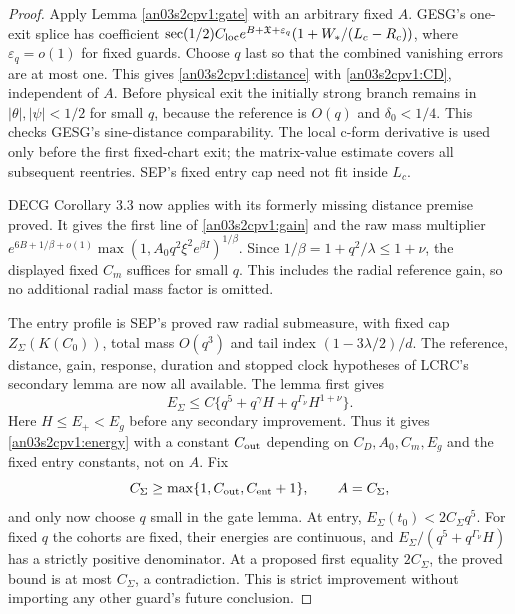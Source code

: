 \documentclass[11pt]{article}
\theoremstyle{remark}\newtheorem{remark}[theorem]{Remark}
\newcommand{\eps}{\varepsilon}
\begin{document}
\begin{proof}
Apply Lemma \ref{an03s2cpv1:gate} with an arbitrary fixed $A$.
GESG's one-exit splice has coefficient
$\sec(1/2)C_{\rm loc}e^{B+\mathfrak X+\eps_q}
(1+W_*/(L_c-R_c))$, where $\eps_q=o(1)$ for fixed guards.
Choose $q$ last so that the combined vanishing errors are at
most one. This gives \eqref{an03s2cpv1:distance} with
\eqref{an03s2cpv1:CD}, independent of $A$.
Before physical exit the initially strong branch remains in
$|\theta|,|\psi|<1/2$ for small $q$, because the reference is
$O(q)$ and $\delta_0<1/4$. This checks GESG's sine-distance
comparability. The local c-form derivative is used only before
the first fixed-chart exit; the matrix-value estimate covers
all subsequent reentries. SEP's fixed entry cap need not fit
inside $L_c$.

DECG Corollary 3.3 now applies with its formerly missing distance
premise proved. It gives the first line of
\eqref{an03s2cpv1:gain} and the raw mass multiplier
$e^{6B+1/\beta+o(1)}\max(1,A_0q^2\xi^2e^{\beta I})^{1/\beta}$.
Since $1/\beta=1+q^2/\lambda\le1+\nu$, the displayed fixed
$C_m$ suffices for small $q$. This includes the radial reference
gain, so no additional radial mass factor is omitted.

The entry profile is SEP's proved raw radial submeasure, with
fixed cap $Z_\Sigma(K(C_0))$, total mass $O(q^3)$ and tail index
$(1-3\lambda/2)/d$. The reference, distance, gain, response,
duration and stopped clock hypotheses of LCRC's secondary lemma
are now all available. The lemma first gives
\[
 E_\Sigma\le C\{q^5+q^\gamma H+q^{\Gamma_\nu}H^{1+\nu}\}.
\]
Here $H\le E_+<E_g$ before any secondary improvement. Thus it
gives \eqref{an03s2cpv1:energy} with a constant $C_{\rm out}$
depending on $C_D,A_0,C_m,E_g$ and the fixed entry constants,
not on $A$. Fix
\begin{equation}
 C_\Sigma\ge\max\{1,C_{\rm out},C_{\rm ent}+1\},\qquad A=C_\Sigma,
 \label{an03s2cpv1:chooseSigma}
\end{equation}
and only now choose $q$ small in the gate lemma. At entry,
$E_\Sigma(t_0)<2C_\Sigma q^5$. For fixed $q$ the cohorts are
fixed, their energies are continuous, and
$E_\Sigma/(q^5+q^{\Gamma_\nu}H)$ has a strictly positive
denominator. At a proposed first equality $2C_\Sigma$, the
proved bound is at most $C_\Sigma$, a contradiction. This
is strict improvement without importing any other guard's
future conclusion.


\end{proof}
\end{document}
